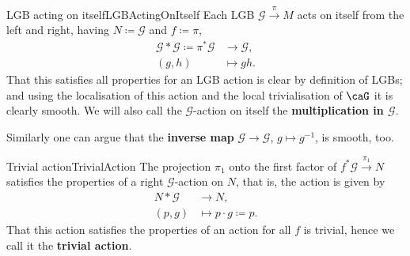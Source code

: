 \documentclass[reqno,a4paper,oneside]{amsart}
\theoremstyle{plain}
\theoremstyle{remark}
\theoremstyle{definition}
\def\bas#1\eas{\begin{align*}#1\end{align*}}
\begin{document}
\begin{examples}{LGB acting on itself}{LGBActingOnItself}
Each LGB $\mathcal{G} \stackrel{\pi}{\to} M$ acts on itself from the left and right, having $N \coloneqq \mathcal{G}$ and $f \coloneqq \pi$,
\begin{align*}
\mathcal{G} * \mathcal{G} \coloneqq \pi^*\mathcal{G} &\to \mathcal{G},\\
(g,h) &\mapsto gh.
\end{align*}
That this satisfies all properties for an LGB action is clear by definition of LGBs; and using the localisation of this action and the local trivialisation of $\caG$ it is clearly smooth.
We will also call the $\mathcal{G}$-action on itself the \textbf{multiplication in $\mathcal{G}$}. 

Similarly one can argue that the \textbf{inverse map} $\mathcal{G} \to \mathcal{G}$, $g \mapsto g^{-1}$, is smooth, too.
\end{examples}

\begin{examples}{Trivial action}{TrivialAction}
The projection $\pi_1$ onto the first factor of $f^*\mathcal{G} \stackrel{\pi_1}{\to} N$ satisfies the properties of a right $\mathcal{G}$-action on $N$, that is, the action is given by
\begin{align*}
N * \mathcal{G} &\to N,\\
(p, g) &\mapsto p \cdot g \coloneqq p.
\end{align*}
That this action satisfies the properties of an action for all $f$ is trivial, hence we call it the \textbf{trivial action}.
\end{examples}
\end{document}
